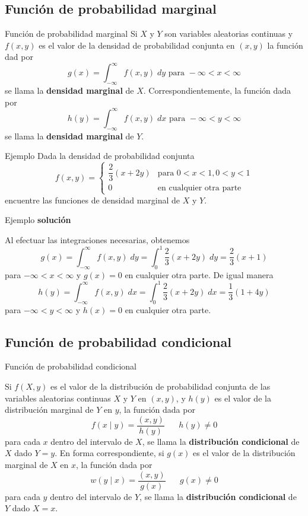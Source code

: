 \documentclass[11pt]{beamer}
\begin{document}
\subsection{Función de probabilidad marginal}
\begin{frame}{Función de probabilidad marginal}
Si $X$ y $Y$ son variables aleatorias continuas y $f(x,y)$ es el valor de la densidad de probabilidad conjunta en $(x,y)$ la función dad por 
$$g(x)=\int_{-\infty}^{\infty}{f(x,y)\; dy} \mbox{ para } -\infty <x<\infty$$
se llama la {\bf densidad marginal} de $X$. Correspondientemente, la función dada por 
$$h(y)=\int_{-\infty}^{\infty}{f(x,y)\; dx} \mbox{ para } -\infty <y<\infty$$
se llama la {\bf densidad marginal} de $Y$. 
\end{frame}


\begin{frame}{Ejemplo}
Dada la densidad de probabilidad conjunta 
$$ f(x,y) =\left\{ \begin {matrix} 
\dfrac{2}{3}(x+2y) & \mbox{para } 0<x<1, 0<y<1 \\ 
0 & \mbox{en cualquier otra parte}
\end{matrix} \right . $$
encuentre las funciones de densidad marginal de $X$ y $Y$.


\end{frame}


\begin{frame}{Ejemplo}
{\bf solución}

Al efectuar las integraciones necesarias, obtenemos 
$$ g(x) =\int_{-\infty}^{\infty}{f(x,y)\; dy} =\int_{0}^{1}{\dfrac{2}{3}(x+2y)  \; dy}= \dfrac{2}{3}(x+1)$$  para $ -\infty <x<\infty $ y $g(x)=0$ en cualquier otra parte. De igual manera
$$h(y) =\int_{-\infty}^{\infty}{f(x,y)\; dx} =\int_{0}^{1}{\dfrac{2}{3}(x+2y)  \; dx}= \dfrac{1}{3}(1+4y)$$  para $ -\infty <y<\infty $ y $h(x)=0$  en cualquier otra parte.
\end{frame}



\subsection{Función de probabilidad condicional}
\begin{frame}{Función de probabilidad condicional}

Si $f(X,y)$ es el valor de la distribución de probabilidad conjunta de las variables aleatorias continuas $X$ y $Y$ en $(x,y)$, y $h(y)$ es el valor de la distribución marginal de $Y$ en $y$, la función dada por $$ f(x \mid y)=\frac{(x, y)}{h(y)} \hspace{20pt} h(y) \ne 0$$
para cada $x$ dentro del intervalo de $X$, se llama la {\bf distribución condicional} de $X$ dado $Y=y$. En forma correspondiente, si $g(x)$ es el valor de la distribución marginal de $X$ en $x$, la función dada por $$w(y \mid x)=\frac{(x, y)}{g(x)} \hspace{20pt} g(x) \ne 0$$
para cada $y$ dentro del intervalo de $Y$, se llama la {\bf distribución condicional} de $Y$ dado $X=x$.
\end{frame}
\end{document}
